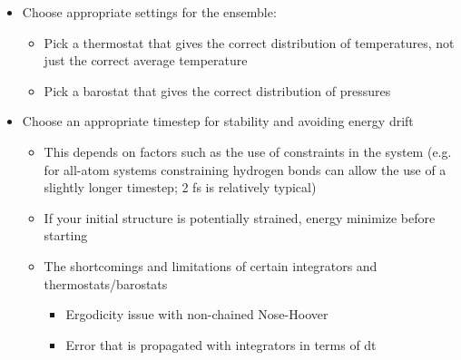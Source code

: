 \documentclass[9pt,bestpractices]{livecoms}
\begin{document}
\begin{itemize}
\begin{itemize}
\end{itemize}
\item Choose appropriate settings for the ensemble:
\begin{itemize}
\item Pick a thermostat that gives the correct distribution of temperatures, not just the correct average temperature
\item Pick a barostat that gives the correct distribution of pressures
\end{itemize}
\item Choose an appropriate timestep for stability and avoiding energy drift
\begin{itemize}
\item This depends on factors such as the use of constraints in the system (e.g. for all-atom systems constraining hydrogen bonds can allow the use of a slightly longer timestep; 2 fs is relatively typical)
\item If your initial structure is potentially strained, energy minimize before starting
\item The shortcomings and limitations of certain integrators and thermostats/barostats
\begin{itemize}
\item Ergodicity issue with non-chained Nose-Hoover
\item Error that is propagated with integrators in terms of dt
\end{itemize}
\end{itemize}
\end{itemize}
\end{document}

